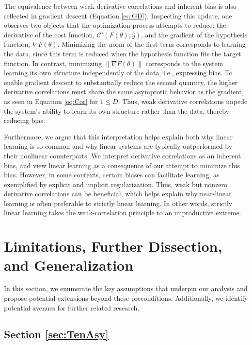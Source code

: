 \documentclass{article} %
\begin{document}
The equivalence between weak derivative correlations and inherent bias is also reflected in gradient descent (Equation \ref{eq:GD}). Inspecting this update, one observes two objects that the optimization process attempts to reduce: the derivative of the cost function, \(\mathcal{C}'(F(\theta),\hat{y})\), and the gradient of the hypothesis function, \(\nabla F(\theta)\). Minimizing the norm of the first term corresponds to learning the data, since this term is reduced when the hypothesis function fits the target function. In contrast, minimizing \(\|\nabla F(\theta)\|\) corresponds to the system learning its own structure independently of the data, \textcolor{black}{i.e., expressing bias}. To enable gradient descent to substantially reduce the second quantity, the higher derivative correlations must share the same asymptotic behavior as the gradient, as seen in Equation \ref{eq:Cor} for \(1\leq D\). Thus, weak derivative correlations impede the system's ability to learn its own structure rather than the data, thereby \textcolor{black}{reducing} bias.

Furthermore, we argue that this interpretation helps explain both why linear learning is so common and why linear systems are typically outperformed by their nonlinear counterparts. We interpret derivative correlations as an inherent bias, and view linear learning as a consequence of our attempt to minimize this bias. However, in some contexts, certain biases can facilitate learning, as exemplified by explicit and implicit regularization. Thus, weak but nonzero derivative correlations can be beneficial, which helps explain why near-linear learning is often preferable to strictly linear learning. In other words, strictly linear learning takes the weak-correlation principle to an unproductive extreme.

\section{Limitations, Further Dissection, and Generalization}
\label{zap:sec:Generalization}

In this section, we enumerate the key assumptions that underpin our analysis and propose potential extensions beyond these preconditions. Additionally, we identify potential avenues for further related research.

\subsection{Section \ref{sec:TenAsy}}
\end{document}
